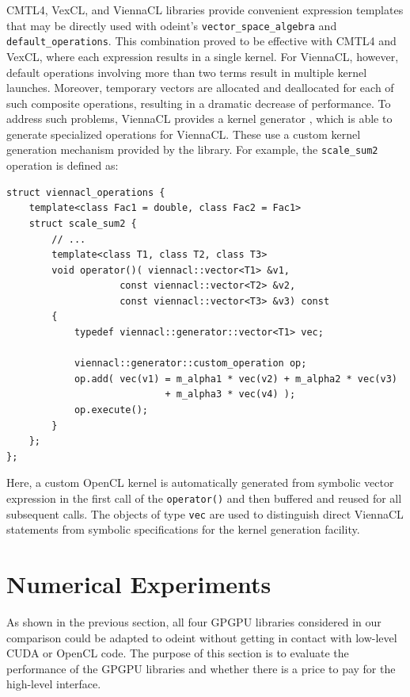 \documentclass[final]{siamltex}
\newcommand{\code}[1]{\lstinline$#1$}
\begin{document}
\begin{sloppypar}
  CMTL4, VexCL, and ViennaCL libraries provide convenient
  expression templates that may be directly used with odeint's
  \code{vector_space_algebra} and \code{default_operations}. This
  combination proved to be effective with CMTL4 and VexCL, where each
  expression results in a single kernel. For ViennaCL, however,
  default operations involving more than two terms result in multiple
  kernel launches.  Moreover, temporary vectors are allocated and
  deallocated for each of such composite operations, resulting in a
  dramatic decrease of performance.  To address such problems,
  ViennaCL provides a kernel generator \cite{tillet:kernel-generator},
  which is able to generate specialized operations for ViennaCL. These
  use a custom kernel generation mechanism provided by the library.
  For example, the \code{scale_sum2} operation is defined as:
\begin{lstlisting}
struct viennacl_operations {
    template<class Fac1 = double, class Fac2 = Fac1>
    struct scale_sum2 {
        // ...
        template<class T1, class T2, class T3>
        void operator()( viennacl::vector<T1> &v1,
                    const viennacl::vector<T2> &v2,
                    const viennacl::vector<T3> &v3) const
        {
            typedef viennacl::generator::vector<T1> vec;

            viennacl::generator::custom_operation op;
            op.add( vec(v1) = m_alpha1 * vec(v2) + m_alpha2 * vec(v3)
                            + m_alpha3 * vec(v4) );
            op.execute();
        }
    };
};
\end{lstlisting}
Here, a custom OpenCL kernel is automatically generated from symbolic vector
expression in the first call of the \code{operator()} and then buffered and reused for all
subsequent calls. The objects of type \code{vec} are used to distinguish direct ViennaCL statements
from symbolic specifications for the kernel generation facility.
\end{sloppypar}










%
%
\section{Numerical Experiments}

As shown in the previous section, all four GP\-GPU libraries considered
in our comparison could be adapted to odeint without getting in
contact with low-level CUDA or OpenCL code.  The purpose of this
section is to evaluate the performance of the GPGPU libraries and
whether there is a price to pay for the high-level interface.
\end{document}
